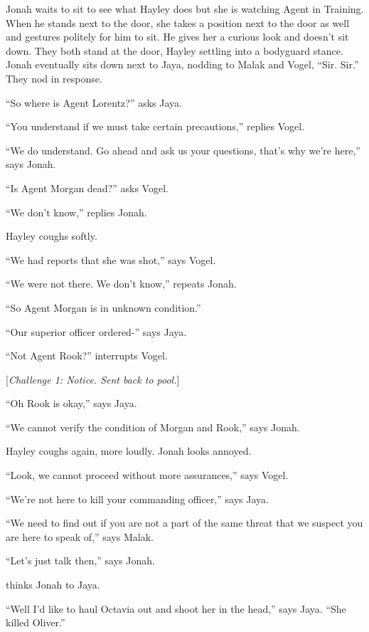 Jonah waits to sit to see what Hayley does but she is watching Agent in Training.  When he stands next to the door, she takes a position next to the door as well and gestures politely for him to sit.  He gives her a curious look and doesn't sit down.  They both stand at the door, Hayley settling into a bodyguard stance.  Jonah eventually sits down next to Jaya, nodding to Malak and Vogel, ``Sir.  Sir.''  They nod in response.



``So where is Agent Lorentz?'' asks Jaya.

``You understand if we must take certain precautions,'' replies Vogel.

``We do understand.  Go ahead and ask us your questions, that's why we're here,'' says Jonah.

``Is Agent Morgan dead?'' asks Vogel.

``We don't know,'' replies Jonah.

Hayley coughs softly.

``We had reports that she was shot,'' says Vogel.

``We were not there.  We don't know,'' repeats Jonah.

``So Agent Morgan is in unknown condition.''

``Our superior officer ordered-'' says Jaya.

``Not Agent Rook?'' interrupts Vogel.

{[}\textit{Challenge 1: Notice.  Sent back to pool.}{]}

``Oh Rook is okay,'' says Jaya.

``We cannot verify the condition of Morgan and Rook,'' says Jonah.

Hayley coughs again, more loudly.  Jonah looks annoyed.

``Look, we cannot proceed without more assurances,'' says Vogel.

``We're not here to kill your commanding officer,'' says Jaya.

``We need to find out if you are not a part of the same threat that we suspect you are here to speak of,'' says Malak.

``Let's just talk then,'' says Jonah.

  thinks Jonah to Jaya.

``Well I'd like to haul Octavia out and shoot her in the head,'' says Jaya.  ``She killed Oliver.''

